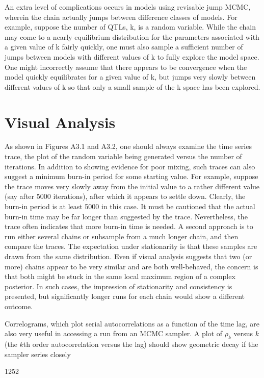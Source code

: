 \documentclass{article}
\begin{document}
An extra level of complications occurs in models using revisable jump MCMC, wherein the chain actually jumps between difference classes of models. For example, suppose the number of QTLs, k, is a random variable. While the chain may come to a nearly equilibrium distribution for the parameters associated with a given value of k fairly quickly, one must also sample a sufficient number of jumps between models with different values of k to fully explore the model space. One might incorrectly assume that there appears to be convergence when the model quickly equilibrates for a given value of k, but jumps very slowly between different values of k so that only a small sample of the k space has been explored.

\section{Visual Analysis}
As shown in Figures A3.1 and A3.2, one should always examine the time series trace, the plot of the random variable being generated versus the number of iterations. In addition to showing evidence for poor mixing, such traces can also suggest a minimum burn-in period for some starting value. For example, suppose the trace moves very slowly away from the initial value to a rather different value (say after 5000 iterations), after which it appears to settle down. Clearly, the burn-in period is at least 5000 in this case. It must be cautioned that the actual burn-in time may be far longer than suggested by the trace. Nevertheless, the trace often indicates that more burn-in time is needed. A second approach is to run either several chains or subsample from a much longer chain, and then compare the traces. The expectation under stationarity is that these samples are drawn from the same distribution. Even if visual analysis suggests that two (or more) chains appear to be very similar and are both well-behaved, the concern is that both might be stuck in the same local maximum region of a complex posterior. In such cases, the impression of stationarity and consistency is presented, but significantly longer runs for each chain would show a different outcome.

Correlograms, which plot serial autocorrelations as a function of the time lag, are also very useful in accessing a run from an MCMC sampler. A plot of  $ \rho_k $ versus  $ k $ (the  $ k $th order autocorrelation versus the lag) should show geometric decay if the sampler series closely

1252
\end{document}
